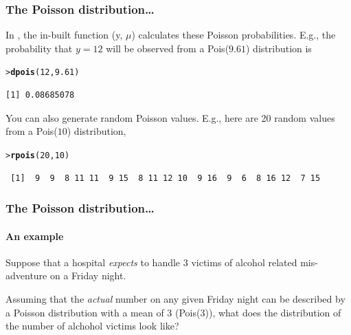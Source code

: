 \documentclass{beamer}\usepackage[]{graphicx}\usepackage[]{xcolor}
\makeatletter
\newcommand{\hlnum}[1]{\textcolor[rgb]{0.686,0.059,0.569}{#1}}%
\newcommand{\hlstd}[1]{\textcolor[rgb]{0.345,0.345,0.345}{#1}}%
\newcommand{\hlkwd}[1]{\textcolor[rgb]{0.737,0.353,0.396}{\textbf{#1}}}%
\newenvironment{kframe}{%
 \def\at@end@of@kframe{}%
 \ifinner\ifhmode%
  \def\at@end@of@kframe{\end{minipage}}%
  \begin{minipage}{\columnwidth}%
 \fi\fi%
 \def\FrameCommand##1{\hskip\@totalleftmargin \hskip-\fboxsep
 \colorbox{shadecolor}{##1}\hskip-\fboxsep
     \hskip-\linewidth \hskip-\@totalleftmargin \hskip\columnwidth}%
 \MakeFramed {\advance\hsize-\width
   \@totalleftmargin\z@ \linewidth\hsize
   \@setminipage}}%
 {\par\unskip\endMakeFramed%
 \at@end@of@kframe}
\newenvironment{knitrout}{}{} %
\makeatother
\begin{document}
\begin{frame}[fragile]
\frametitle{The Poisson distribution\ldots}
In , the in-built function (y, $\mu$) calculates these Poisson probabilities.
E.g., the probability that $y=12$ will be observed from a Pois($9.61$) distribution is

\begin{knitrout}\scriptsize
{}\color{fgcolor}\begin{kframe}
\begin{alltt}
\hlstd{> }\hlkwd{dpois}\hlstd{(}\hlnum{12}\hlstd{,}\hlnum{9.61}\hlstd{)}
\end{alltt}
\begin{verbatim}
[1] 0.08685078
\end{verbatim}
\end{kframe}
\end{knitrout}
\bigskip

You can also generate random Poisson values. E.g., here are 20 random values from a Pois($10$)
distribution,
\begin{knitrout}\scriptsize
{}\color{fgcolor}\begin{kframe}
\begin{alltt}
\hlstd{> }\hlkwd{rpois}\hlstd{(}\hlnum{20}\hlstd{,}\hlnum{10}\hlstd{)}
\end{alltt}
\begin{verbatim}
 [1]  9  9  8 11 11  9 15  8 11 12 10  9 16  9  6  8 16 12  7 15
\end{verbatim}
\end{kframe}
\end{knitrout}

\end{frame}


\begin{frame}[fragile]
\frametitle{The Poisson distribution\ldots}
\framesubtitle{An example}
Suppose that a hospital {\em expects} to handle 3 victims of alcohol related mis-adventure
on a Friday night.
\bigskip

Assuming that the {\em actual} number on any given Friday night can be described by a Poisson distribution with
a mean of 3 (Pois($3$)), what does the distribution of the number of alchohol victims look like?
\end{frame}
\end{document}
